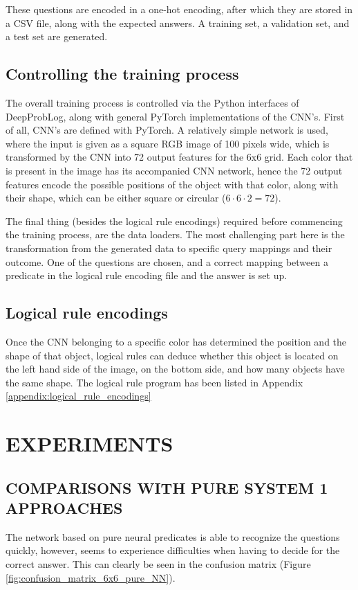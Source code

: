 \documentclass[english]{sobraep}
\begin{document}
These questions are encoded in a one-hot encoding, after which they are stored in a CSV file, along with the expected answers. A training set, a validation set, and a test set are generated. %

\subsection{Controlling the training process}
The overall training process is controlled via the Python interfaces of DeepProbLog, along with general PyTorch implementations of the CNN's.
First of all, CNN's are defined with PyTorch. A relatively simple network is used, where the input is given as a square RGB image of 100 pixels wide, which is transformed by the CNN into 72 output features for the 6x6 grid. Each color that is present in the image has its accompanied CNN network, hence the 72 output features encode the possible positions of the object with that color, along with their shape, which can be either square or circular ($6 \cdot 6 \cdot 2 = 72$).

The final thing (besides the logical rule encodings) required before commencing the training process, are the data loaders. The most challenging part here is the transformation from the generated data to specific query mappings and their outcome. One of the questions are chosen, and a correct mapping between a predicate in the logical rule encoding file and the answer is set up.

\subsection{Logical rule encodings}
Once the CNN belonging to a specific color has determined the position and the shape of that object, logical rules can deduce whether this object is located on the left hand side of the image, on the bottom side, and how many objects have the same shape. The logical rule program has been listed in Appendix \ref{appendix:logical_rule_encodings}

\section{EXPERIMENTS}
\label{sec:experiments}

\subsection{COMPARISONS WITH PURE SYSTEM 1 APPROACHES}
\label{subsec:experiments_NN_vs_deepproblog}
The network based on pure neural predicates is able to recognize the questions quickly, however, seems to experience difficulties when having to decide for the correct answer. This can clearly be seen in the confusion matrix (Figure \ref{fig:confusion_matrix_6x6_pure_NN}). %
\end{document}
